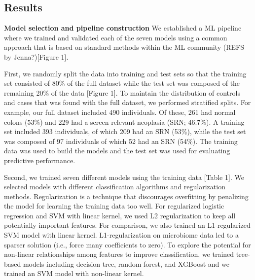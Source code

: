 \documentclass[11pt,]{article}
\begin{document}
\subsection{Results}\label{results}

\textbf{Model selection and pipeline construction} We established a ML
pipeline where we trained and validated each of the seven models using a
common approach that is based on standard methods within the ML
community (REFS by Jenna?){[}Figure 1{]}.

First, we randomly split the data into training and test sets so that
the training set consisted of 80\% of the full dataset while the test
set was composed of the remaining 20\% of the data {[}Figure 1{]}. To
maintain the distribution of controls and cases that was found with the
full dataset, we performed stratified splits. For example, our full
dataset included 490 individuals. Of these, 261 had normal colons (53\%)
and 229 had a screen relevant neoplasia (SRN; 46.7\%). A training set
included 393 individuals, of which 209 had an SRN (53\%), while the test
set was composed of 97 individuals of which 52 had an SRN (54\%). The
training data was used to build the models and the test set was used for
evaluating predictive performance.

Second, we trained seven different models using the training data
{[}Table 1{]}. We selected models with different classification
algorithms and regularization methods. Regularization is a technique
that discourages overfitting by penalizing the model for learning the
training data too well. For regularized logistic regression and SVM with
linear kernel, we used L2 regularization to keep all potentially
important features. For comparison, we also trained an L1-regularized
SVM model with linear kernel. L1-regularization on microbiome data led
to a sparser solution (i.e., force many coefficients to zero). To
explore the potential for non-linear relationships among features to
improve classification, we trained tree-based models including decision
tree, random forest, and XGBoost and we trained an SVM model with
non-linear kernel.
\end{document}
